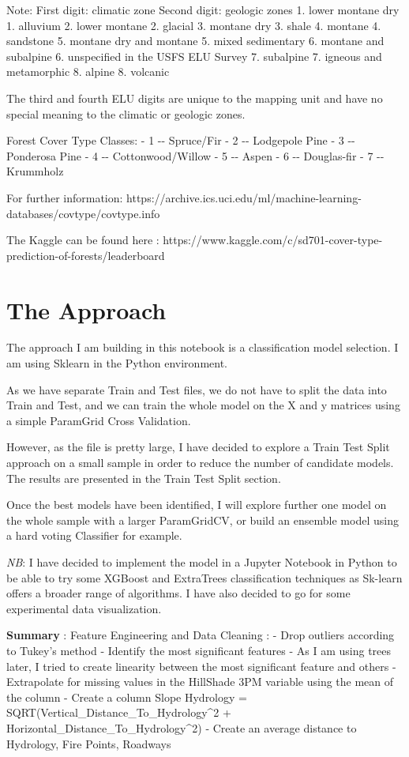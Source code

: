\documentclass[11pt]{article}
\begin{document}
Note: First digit: climatic zone Second digit: geologic zones 1. lower
montane dry 1. alluvium 2. lower montane 2. glacial 3. montane dry 3.
shale 4. montane 4. sandstone 5. montane dry and montane 5. mixed
sedimentary 6. montane and subalpine 6. unspecified in the USFS ELU
Survey 7. subalpine 7. igneous and metamorphic 8. alpine 8. volcanic

The third and fourth ELU digits are unique to the mapping unit and have
no special meaning to the climatic or geologic zones.

Forest Cover Type Classes: - 1 -\/- Spruce/Fir - 2 -\/- Lodgepole Pine -
3 -\/- Ponderosa Pine - 4 -\/- Cottonwood/Willow - 5 -\/- Aspen - 6 -\/-
Douglas-fir - 7 -\/- Krummholz

For further information:
https://archive.ics.uci.edu/ml/machine-learning-databases/covtype/covtype.info

The Kaggle can be found here :
https://www.kaggle.com/c/sd701-cover-type-prediction-of-forests/leaderboard

    \section{The Approach}\label{the-approach}

    The approach I am building in this notebook is a classification model
selection. I am using Sklearn in the Python environment.

As we have separate Train and Test files, we do not have to split the
data into Train and Test, and we can train the whole model on the X and
y matrices using a simple ParamGrid Cross Validation.

However, as the file is pretty large, I have decided to explore a Train
Test Split approach on a small sample in order to reduce the number of
candidate models. The results are presented in the Train Test Split
section.

Once the best models have been identified, I will explore further one
model on the whole sample with a larger ParamGridCV, or build an
ensemble model using a hard voting Classifier for example.

\emph{NB}: I have decided to implement the model in a Jupyter Notebook
in Python to be able to try some XGBoost and ExtraTrees classification
techniques as Sk-learn offers a broader range of algorithms. I have also
decided to go for some experimental data visualization.

\textbf{Summary} : Feature Engineering and Data Cleaning : - Drop
outliers according to Tukey's method - Identify the most significant
features - As I am using trees later, I tried to create linearity
between the most significant feature and others - Extrapolate for
missing values in the HillShade 3PM variable using the mean of the
column - Create a column Slope Hydrology =
SQRT(Vertical\_Distance\_To\_Hydrology\^{}2 +
Horizontal\_Distance\_To\_Hydrology\^{}2) - Create an average distance
to Hydrology, Fire Points, Roadways
\end{document}
